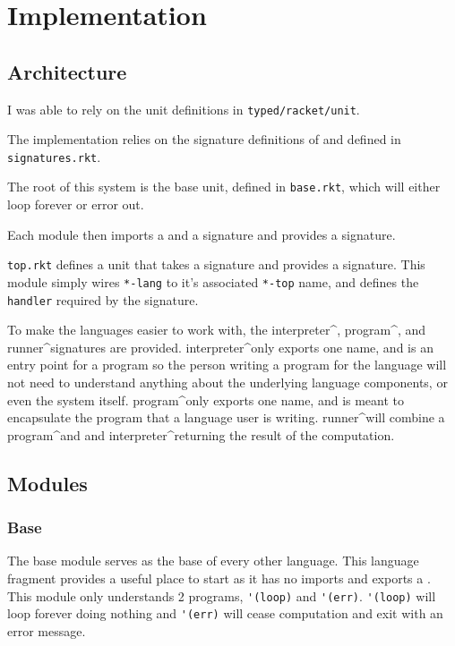 
\section{Implementation}
\subsection{Architecture}
I was able to rely on the unit definitions in \verb#typed/racket/unit#.

The implementation relies on the signature definitions of \langSig and \topSig defined in \verb#signatures.rkt#.


The root of this system is the base unit, defined in \verb#base.rkt#, which will either loop forever or error out.

Each module then imports a \langSig and a \topSig signature and provides a \langSig signature.

\verb#top.rkt# defines a unit that takes a \langSig signature and provides a \topSig signature. This module simply wires \verb#*-lang# to it's associated \verb#*-top# name, and defines the \verb#handler# required by the \topSig signature.


To make the languages easier to work with, the interpreter\textasciicircum, program\textasciicircum, and runner\textasciicircum signatures are provided. interpreter\textasciicircum only exports one name, and is an entry point for a program so the person writing a program for the language will not need to understand anything about the underlying language components, or even the system itself. program\textasciicircum only exports one name, and is meant to encapsulate the program that a language user is writing. runner\textasciicircum will combine a program\textasciicircum and and interpreter\textasciicircum returning the result of the computation. 
\subsection{Modules}
\subsubsection{Base}
The base module serves as the base of every other language. This language fragment provides a useful place to start as it has no imports and exports a \langSig. This module only understands 2 programs, \verb#'(loop)# and \verb#'(err)#. \verb#'(loop)# will loop forever doing nothing and \verb#'(err)# will cease computation and exit with an error message.

